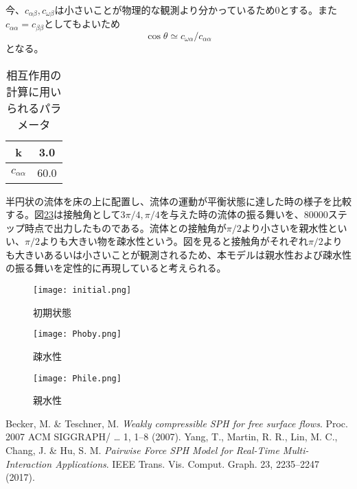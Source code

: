 \documentclass[]{jsarticle}
\begin{document}
今、$c_{\alpha\beta},c_{\omega\beta}$は小さいことが物理的な観測より分かっているため0とする。また$c_{\alpha\alpha}=c_{\beta\beta}$としてもよいため
\begin{equation}
\cos\theta\simeq c_{\omega\alpha}/c_{\alpha\alpha}
\end{equation}
となる。
\begin{table}[h]
  \caption{相互作用の計算に用いられるパラメータ}
  \label{interParam}
  \begin{center}
    \begin{tabular}{|c|c|}\hline
      k&3.0 \\ \hline
      $c_{\alpha\alpha}$ & 60.0 \\ \hline
    \end{tabular}
  \end{center}  
\end{table}

半円状の流体を床の上に配置し、流体の運動が平衡状態に達した時の様子を比較する。図\ref{fig:Phoby}\ref{fig:Phile}は接触角として$3\pi/4, \pi/4$を与えた時の流体の振る舞いを、80000ステップ時点で出力したものである。流体との接触角が$\pi/2$より小さいを親水性といい、$\pi/2$よりも大きい物を疎水性という。図を見ると接触角がそれぞれ$\pi/2$よりも大きいあるいは小さいことが観測されるため、本モデルは親水性および疎水性の振る舞いを定性的に再現していると考えられる。
\begin{figure}[H]
  \centering
  \texttt{[image: initial.png]}
  \caption{初期状態}
  \label{fig:initial}
\end{figure}
\begin{figure}[H]
    \centering
    \texttt{[image: Phoby.png]}
    \caption{疎水性}
    \label{fig:Phoby}
  \end{figure}
  \begin{figure}[H]
    \centering
    \texttt{[image: Phile.png]}
    \caption{親水性}
    \label{fig:Phile}
\end{figure}

\begin{thebibliography}{99}
  Becker, M. \& Teschner, M. \textit{Weakly compressible SPH for free surface flows}. Proc. 2007 ACM SIGGRAPH/ … 1, 1–8 (2007).
  Yang, T., Martin, R. R., Lin, M. C., Chang, J. \& Hu, S. M.
  \textit{Pairwise Force SPH Model for Real-Time Multi-Interaction Applications}.
  IEEE Trans. Vis. Comput. Graph. 23, 2235–2247 (2017).
\end{thebibliography}
\end{document}
